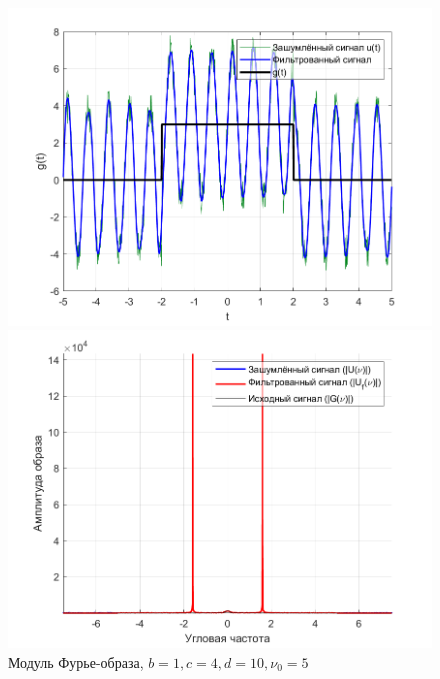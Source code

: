 \documentclass[a4paper]{article}
\begin{document}
\begin{figure}[H]
    \begin{minipage}{0.5\textwidth}
        \centering
        \includegraphics[width=\textwidth]{part2/1_4_10.png}
        \caption{$b = 1, c = 4, d = 10, \nu_0 = 5$}
    \end{minipage}    
    \begin{minipage}{0.5\textwidth}
        \centering
        \includegraphics[width=\textwidth]{part2/1_4_10_Fourier.png}
        \caption{Модуль Фурье-образа, $b = 1, c = 4, d = 10, \nu_0 = 5$}
    \end{minipage}
\end{figure}\
\end{document}
